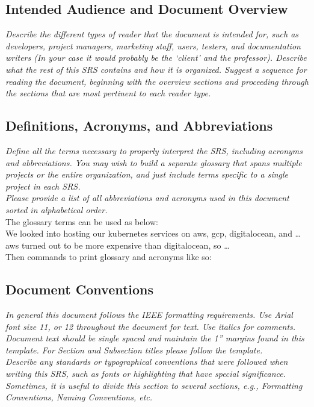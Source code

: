 \documentclass{article}
\newcommand{\gnl}{\vspace{1em}\\}      %
\begin{document}
    \subsection{Intended Audience and Document Overview}
        \emph{Describe the different types of reader that the document is intended for, such as developers, project managers, marketing staff, users, testers, and documentation writers (In your case it would probably be the `client' and the professor). Describe what the rest of this SRS contains and how it is organized. Suggest a sequence for reading the document, beginning with the overview sections and proceeding through the sections that are most pertinent to each reader type.}
    \subsection{Definitions, Acronyms, and Abbreviations}
        \emph{Define all the terms necessary to properly interpret the SRS, including acronyms and abbreviations. You may wish to build a separate glossary that spans multiple projects or the entire organization, and just include terms specific to a single project in each SRS.\gnl Please provide a list of all abbreviations and acronyms used in this document sorted in alphabetical order.}
        \gnl The glossary terms can be used as below:
        \\\hspace*{10mm} We looked into hosting our \gls{kubernetes} services on \gls{aws}, \gls{gcp}, \gls{digitalocean}, and \dots \Gls{aws} turned out to be more expensive than \gls{digitalocean}, so \dots
        \\ Then commands to print glossary and acronyms like so: 
        \printnoidxglossary
        \printnoidxglossary[type=acronym]
        \printacronyms
    \subsection{Document Conventions}
        \emph{In general this document follows the IEEE formatting requirements. Use Arial font size 11, or 12 throughout the document for text. Use italics for comments. Document text should be single spaced and maintain the 1” margins found in this template. For Section and Subsection titles please follow the template.\gnl Describe any standards or typographical conventions that were followed when writing this SRS, such as fonts or highlighting that have special significance. Sometimes, it is useful to divide this section to several sections, e.g., Formatting Conventions, Naming Conventions, etc.}
\end{document}
